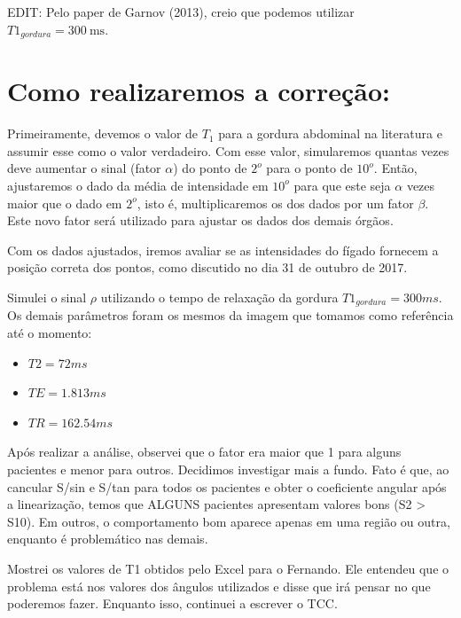 \documentclass[idxtotoc,hyperref,openany]{labbook} %
\begin{document}
EDIT: Pelo paper de Garnov (2013), creio que podemos utilizar $T1_{gordura}=\SI{300}{\milli \second}$.

 \section*{Como realizaremos a correção:}
 
  Primeiramente, devemos o valor de $T_1$ para a gordura abdominal na literatura e assumir esse como o valor verdadeiro. Com esse valor, simularemos quantas vezes deve aumentar o sinal (fator $\alpha$) do ponto de $2^o$ para o ponto de $10^o$. Então, ajustaremos o dado da média de intensidade em $10^o$ para que este seja $\alpha$ vezes maior que o dado em $2^o$, isto é, multiplicaremos os dos dados por um fator $\beta$. Este novo fator será utilizado para ajustar os dados dos demais órgãos.
  
  Com os dados ajustados, iremos avaliar se as intensidades do fígado fornecem a posição correta dos pontos, como discutido no dia 31 de outubro de 2017. 




Simulei o sinal $\rho$ utilizando o tempo de relaxação da gordura $T1_{gordura} = 300 ms$. Os demais parâmetros foram os mesmos da imagem que tomamos como referência até o momento:

\begin{itemize}
	\item $T2 = 72 ms$
	\item $TE = 1.813 ms$
	\item $TR = 162.54 ms$
\end{itemize}

Após realizar a análise, observei que o fator era maior que 1 para alguns pacientes e menor para outros. Decidimos investigar mais a fundo. Fato é que, ao cancular S/sin e S/tan para todos os pacientes e obter o coeficiente angular após a linearização, temos que ALGUNS pacientes apresentam valores bons (S2 > S10). Em outros, o comportamento bom aparece apenas em uma região ou outra, enquanto é problemático nas demais.

\label{Sexta, 10 de novembro de 2017}


Mostrei os valores de T1 obtidos pelo Excel para o Fernando. Ele entendeu que o problema está nos valores dos ângulos utilizados e disse que irá pensar no que poderemos fazer. Enquanto isso, continuei a escrever o TCC.
\end{document}
